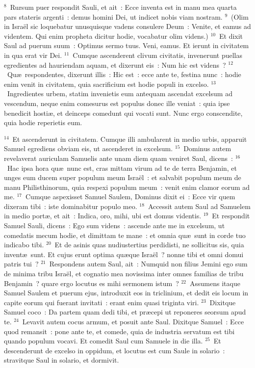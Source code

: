 ${}^{8}$~Rursum puer respondit Sauli, et ait~: Ecce inventa est in manu mea quarta pars stateris argenti~: demus homini Dei, ut indicet nobis viam nostram.
${}^{9}$~(Olim in Isra\"el sic loquebatur unusquisque vadens consulere Deum~: Venite, et eamus ad videntem. Qui enim propheta dicitur hodie, vocabatur olim videns.)
${}^{10}$~Et dixit Saul ad puerum suum~: Optimus sermo tuus. Veni, eamus. Et ierunt in civitatem in qua erat vir Dei.
${}^{11}$~Cumque ascenderent clivum civitatis, invenerunt puellas egredientes ad hauriendam aquam, et dixerunt eis~: Num hic est videns~?
${}^{12}$~Qu\ae\ respondentes, dixerunt illis~: Hic est~: ecce ante te, festina nunc~: hodie enim venit in civitatem, quia sacrificium est hodie populi in excelso.
${}^{13}$~Ingredientes urbem, statim invenietis eum antequam ascendat excelsum ad vescendum, neque enim comesurus est populus donec ille veniat~: quia ipse benedicit hosti\ae , et deinceps comedunt qui vocati sunt. Nunc ergo conscendite, quia hodie reperietis eum.


${}^{14}$~Et ascenderunt in civitatem. Cumque illi ambularent in medio urbis, apparuit Samuel egrediens obviam eis, ut ascenderet in excelsum.
${}^{15}$~Dominus autem revelaverat auriculam Samuelis ante unam diem quam veniret Saul, dicens~:
${}^{16}$~Hac ipsa hora qu\ae\ nunc est, cras mittam virum ad te de terra Benjamin, et unges eum ducem super populum meum Isra\"el~: et salvabit populum meum de manu Philisthinorum, quia respexi populum meum~: venit enim clamor eorum ad me.
${}^{17}$~Cumque aspexisset Samuel Saulem, Dominus dixit ei~: Ecce vir quem dixeram tibi~: iste dominabitur populo meo.
${}^{18}$~Accessit autem Saul ad Samuelem in medio port\ae , et ait~: Indica, oro, mihi, ubi est domus videntis.
${}^{19}$~Et respondit Samuel Sauli, dicens~: Ego sum videns~: ascende ante me in excelsum, ut comedatis mecum hodie, et dimittam te mane~: et omnia qu\ae\ sunt in corde tuo indicabo tibi.
${}^{20}$~Et de asinis quas nudiustertius perdidisti, ne sollicitus sis, quia invent\ae\ sunt. Et cujus erunt optima qu\ae que Isra\"el~? nonne tibi et omni domui patris tui~?
${}^{21}$~Respondens autem Saul, ait~: Numquid non filius Jemini ego sum de minima tribu Isra\"el, et cognatio mea novissima inter omnes familias de tribu Benjamin~? quare ergo locutus es mihi sermonem istum~?
${}^{22}$~Assumens itaque Samuel Saulem et puerum ejus, introduxit eos in triclinium, et dedit eis locum in capite eorum qui fuerant invitati~: erant enim quasi triginta viri.
${}^{23}$~Dixitque Samuel coco~: Da partem quam dedi tibi, et pr\ae cepi ut reponeres seorsum apud te.
${}^{24}$~Levavit autem cocus armum, et posuit ante Saul. Dixitque Samuel~: Ecce quod remansit~: pone ante te, et comede, quia de industria servatum est tibi quando populum vocavi. Et comedit Saul cum Samuele in die illa.
${}^{25}$~Et descenderunt de excelso in oppidum, et locutus est cum Saule in solario~: stravitque Saul in solario, et dormivit.


